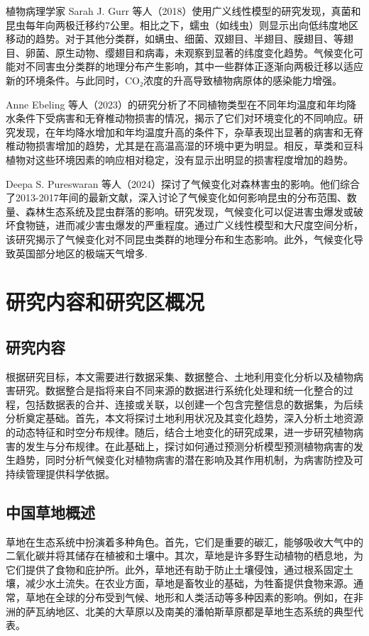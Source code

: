 \documentclass[AutoFakeBold]{LZUThesis-PgD&PhD}
\begin{document}
植物病理学家 Sarah J. Gurr 等人（2018）使用广义线性模型的研究发现，真菌和昆虫每年向两极迁移约7公里。相比之下，蠕虫（如线虫）则显示出向低纬度地区移动的趋势。对于其他分类群，如螨虫、细菌、双翅目、半翅目、膜翅目、等翅目、卵菌、原生动物、缨翅目和病毒，未观察到显著的纬度变化趋势。气候变化可能对不同害虫分类群的地理分布产生影响，其中一些群体正逐渐向两极迁移以适应新的环境条件。与此同时，CO₂浓度的升高导致植物病原体的感染能力增强\cite{sukumar2018co2}。

Anne Ebeling 等人（2023）的研究分析了不同植物类型在不同年均温度和年均降水条件下受病害和无脊椎动物损害的情况，揭示了它们对环境变化的不同响应。研究发现，在年均降水增加和年均温度升高的条件下，杂草表现出显著的病害和无脊椎动物损害增加的趋势，尤其是在高温高湿的环境中更为明显。相反，草类和豆科植物对这些环境因素的响应相对稳定，没有显示出明显的损害程度增加的趋势\cite{ebeling2023response}。

Deepa S. Pureswaran 等人（2024）探讨了气候变化对森林害虫的影响。他们综合了2013-2017年间的最新文献，深入讨论了气候变化如何影响昆虫的分布范围、数量、森林生态系统及昆虫群落的影响。研究发现，气候变化可以促进害虫爆发或破坏食物链，进而减少害虫爆发的严重程度。通过广义线性模型和大尺度空间分析，该研究揭示了气候变化对不同昆虫类群的地理分布和生态影响。此外，气候变化导致英国部分地区的极端天气增多\cite{angelotti2024forest}.

\section{研究内容和研究区概况}

\subsection{研究内容}
根据研究目标，本文需要进行数据采集、数据整合、土地利用变化分析以及植物病害研究。数据整合是指将来自不同来源的数据进行系统化处理和统一化整合的过程，包括数据表的合并、连接或关联，以创建一个包含完整信息的数据集，为后续分析奠定基础。首先，本文将探讨土地利用状况及其变化趋势，深入分析土地资源的动态特征和时空分布规律。随后，结合土地变化的研究成果，进一步研究植物病害的发生与分布规律。在此基础上，探讨如何通过预测分析模型预测植物病害的发生趋势，同时分析气候变化对植物病害的潜在影响及其作用机制，为病害防控及可持续管理提供科学依据。

\subsection{中国草地概述}
	草地在生态系统中扮演着多种角色。首先，它们是重要的碳汇，能够吸收大气中的二氧化碳并将其储存在植被和土壤中。其次，草地是许多野生动植物的栖息地，为它们提供了食物和庇护所。此外，草地还有助于防止土壤侵蚀，通过根系固定土壤，减少水土流失。在农业方面，草地是畜牧业的基础，为牲畜提供食物来源。通常，草地在全球的分布受到气候、地形和人类活动等多种因素的影响。例如，在非洲的萨瓦纳地区、北美的大草原以及南美的潘帕斯草原都是草地生态系统的典型代表。
	
\end{document}
